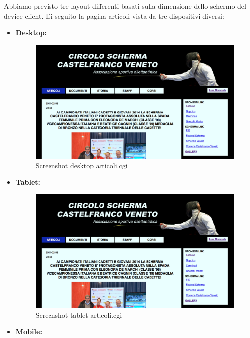Abbiamo previsto tre layout differenti basati sulla dimensione dello schermo del device client. Di seguito la pagina articoli vista da tre dispositivi diversi:
\begin{itemize}
	\item \bfseries{Desktop}:
		\begin{figure}[h]
		\centering
		\includegraphics[scale=0.32]{images/articoli_desktop.png}
		\caption{Screenshot desktop articoli.cgi}
	\end{figure}
	\item \bfseries{Tablet}:
		\begin{figure}[h]
			\centering
			\includegraphics[scale=0.30]{images/articoli_tablet.png}
			\caption{Screenshot tablet articoli.cgi}
		\end{figure}
	\item \bfseries{Mobile}:
		\begin{figure}[h]
			\centering

\end{figure}
\end{itemize}
